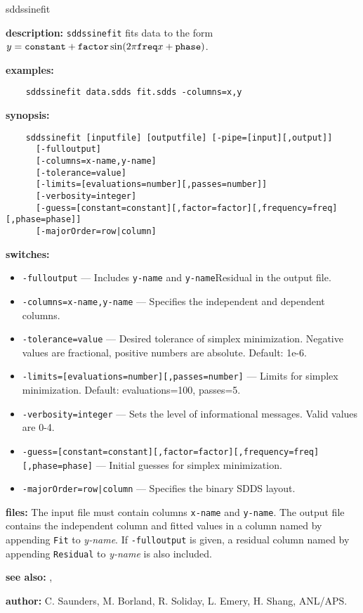 \begin{sddsprog}{sddssinefit}
  \item \textbf{description:} \verb|sddssinefit| fits data to the form
    $y = \verb|constant| + \verb|factor| \sin(2\pi \verb|freq| x + \verb|phase|)$.
  \item \textbf{examples:}
    \begin{verbatim}
    sddssinefit data.sdds fit.sdds -columns=x,y
    \end{verbatim}
  \item \textbf{synopsis:}
    \begin{verbatim}
    sddssinefit [inputfile] [outputfile] [-pipe=[input][,output]]
      [-fulloutput]
      [-columns=x-name,y-name]
      [-tolerance=value]
      [-limits=[evaluations=number][,passes=number]]
      [-verbosity=integer]
      [-guess=[constant=constant][,factor=factor][,frequency=freq][,phase=phase]]
      [-majorOrder=row|column]
    \end{verbatim}
  \item \textbf{switches:}
    \begin{itemize}
      \item \verb|-fulloutput| --- Includes \verb|y-name| and \verb|y-name|Residual in the output file.
      \item \verb|-columns=x-name,y-name| --- Specifies the independent and dependent columns.
      \item \verb|-tolerance=value| --- Desired tolerance of simplex minimization. Negative values are fractional,
        positive numbers are absolute. Default: 1e-6.
      \item \verb|-limits=[evaluations=number][,passes=number]| --- Limits for simplex minimization.
        Default: evaluations=100, passes=5.
      \item \verb|-verbosity=integer| --- Sets the level of informational messages. Valid values are 0-4.
      \item \verb|-guess=[constant=constant][,factor=factor][,frequency=freq][,phase=phase]| --- Initial guesses for
        simplex minimization.
      \item \verb!-majorOrder=row|column! --- Specifies the binary SDDS layout.
    \end{itemize}
  \item \textbf{files:} The input file must contain columns \verb|x-name| and \verb|y-name|. The output file contains the
    independent column and fitted values in a column named by appending \verb|Fit| to \emph{y-name}. If \verb|-fulloutput| is
    given, a residual column named by appending \verb|Residual| to \emph{y-name} is also included.
  \item \textbf{see also:} , 
  \item \textbf{author:} C. Saunders, M. Borland, R. Soliday, L. Emery, H. Shang, ANL/APS.
\end{sddsprog}

